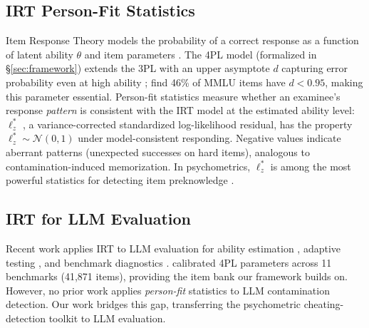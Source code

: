 \subsection{IRT Person-Fit Statistics}\label{sec:irt_background}

Item Response Theory models the probability of a correct response as a function of latent ability $\theta$ and item parameters \citep{birnbaum1968, lord1980, embretson2000}.
The 4PL model (formalized in \S\ref{sec:framework}) extends the 3PL with an upper asymptote $d$ capturing error probability even at high ability \citep{barton1981}; \citet{psnirt2026} find 46\% of MMLU items have $d < 0.95$, making this parameter essential.
Person-fit statistics measure whether an examinee's response \emph{pattern} is consistent with the IRT model at the estimated ability level: $\ell_z^*$ \citep{snijders2001}, a variance-corrected standardized log-likelihood residual, has the property $\ell_z^* \sim \mathcal{N}(0,1)$ under model-consistent responding.
Negative values indicate aberrant patterns (unexpected successes on hard items), analogous to contamination-induced memorization.
In psychometrics, $\ell_z^*$ is among the most powerful statistics for detecting item preknowledge \citep{karabatsos2003, sinharay2017, meijer2001}.

\subsection{IRT for LLM Evaluation}\label{sec:irt_llm}

Recent work applies IRT to LLM evaluation for ability estimation \citep{martinezplumed2019, polo2024tinybenchmarks}, adaptive testing \citep{atlas2025}, and benchmark diagnostics \citep{psnirt2026}.
\citet{psnirt2026} calibrated 4PL parameters across 11 benchmarks (41,871 items), providing the item bank our framework builds on.
However, no prior work applies \emph{person-fit} statistics to LLM contamination detection.
Our work bridges this gap, transferring the psychometric cheating-detection toolkit to LLM evaluation.
